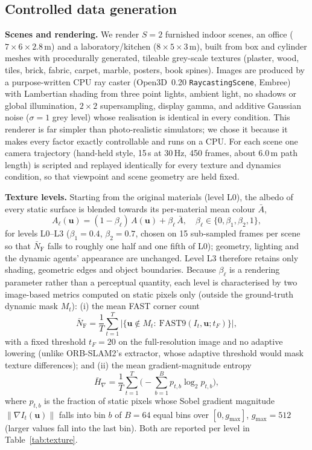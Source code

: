 \documentclass[conference]{IEEEtran}
\newcommand{\NFAST}{\bar{N}_{\mathrm{F}}}
\newcommand{\Hgrad}{\bar{H}_{\nabla}}
\begin{document}
\subsection{Controlled data generation}
\label{sec:data}
\textbf{Scenes and rendering.} We render $S=2$ furnished indoor scenes, an office ($7\times6\times2.8$\,m) and a laboratory/kitchen ($8\times5\times3$\,m), built from box and cylinder meshes with procedurally generated, tileable grey-scale textures (plaster, wood, tiles, brick, fabric, carpet, marble, posters, book spines). Images are produced by a purpose-written CPU ray caster (Open3D~0.20 \texttt{RaycastingScene}, Embree) with Lambertian shading from three point lights, ambient light, no shadows or global illumination, $2\times2$ supersampling, display gamma, and additive Gaussian noise ($\sigma=1$ grey level) whose realisation is identical in every condition. This renderer is far simpler than photo-realistic simulators; we chose it because it makes every factor exactly controllable and runs on a CPU. For each scene one camera trajectory (hand-held style, 15\,s at 30\,Hz, 450 frames, about 6.0\,m path length) is scripted and replayed identically for every texture and dynamics condition, so that viewpoint and scene geometry are held fixed.

\textbf{Texture levels.} Starting from the original materials (level L0), the albedo of every static surface is blended towards its per-material mean colour $\bar{A}$,
\begin{equation}
A_\ell(\mathbf{u})=(1-\beta_\ell)\,A(\mathbf{u})+\beta_\ell\,\bar{A},\quad \beta_\ell\in\{0,\beta_1,\beta_2,1\},
\end{equation}
for levels L0--L3 ($\beta_1=0.4$, $\beta_2=0.7$, chosen on 15 sub-sampled frames per scene so that $\NFAST$ falls to roughly one half and one fifth of L0); geometry, lighting and the dynamic agents' appearance are unchanged. Level L3 therefore retains only shading, geometric edges and object boundaries. Because $\beta_\ell$ is a rendering parameter rather than a perceptual quantity, each level is characterised by two image-based metrics computed on static pixels only (outside the ground-truth dynamic mask $M_t$): (i) the mean FAST corner count
\begin{equation}
\NFAST=\frac{1}{T}\sum_{t=1}^{T}\big|\{\mathbf{u}\notin M_t:\ \mathrm{FAST9}(I_t,\mathbf{u};t_F)\}\big|,
\end{equation}
with a fixed threshold $t_F=20$ on the full-resolution image and no adaptive lowering (unlike ORB-SLAM2's extractor, whose adaptive threshold would mask texture differences); and (ii) the mean gradient-magnitude entropy
\begin{equation}
\Hgrad=\frac{1}{T}\sum_{t=1}^{T}\Big(-\sum_{b=1}^{B}p_{t,b}\log_2 p_{t,b}\Big),
\end{equation}
where $p_{t,b}$ is the fraction of static pixels whose Sobel gradient magnitude $\|\nabla I_t(\mathbf{u})\|$ falls into bin $b$ of $B=64$ equal bins over $[0,g_{\max}]$, $g_{\max}=512$ (larger values fall into the last bin). Both are reported per level in Table~\ref{tab:texture}.
\end{document}
